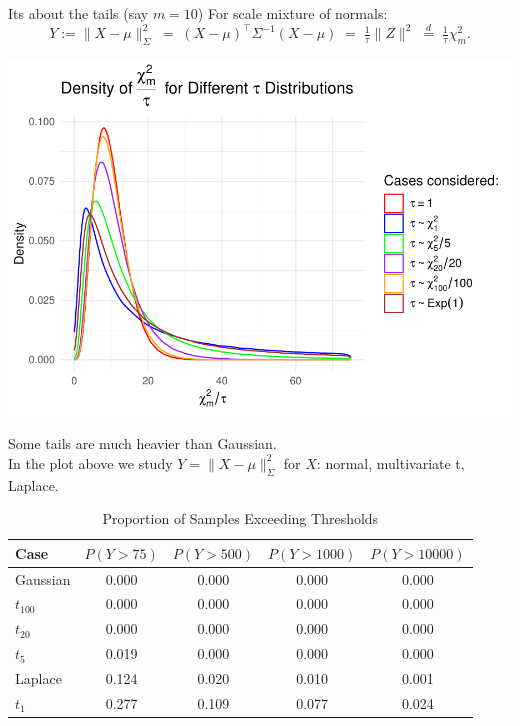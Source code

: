 \documentclass[11pt,handout,aspectratio=169]{beamer}
\begin{document}
\begin{frame}{Its about the tails (say $m=10$)}
	For scale mixture of normals:
	$$
	Y:=\|X-\mu\|_\Sigma^2\;=\;(X-\mu)^\top \Sigma^{-1}(X-\mu)\;=\;\tfrac{1}{\tau}\|Z\|^2\;\overset{d}{=}\;\tfrac{1}{\tau} \chi^2_m.
	$$
	\begin{center}
		\includegraphics[scale=.7]{pics/SNMtails.pdf}
	\end{center}
\end{frame}

\begin{frame}{}
Some tails are \alert{much} heavier than Gaussian. \\[3mm]

In the plot above we study $Y=\|X-\mu\|_\Sigma^2$ for $X$: normal, multivariate t, Laplace. 
	\begin{table}[h]
    \centering
    \begin{tabular}{lcccc}
        \hline
        \textbf{Case} & $P(Y > 75)$ & $P(Y > 500)$ & $P(Y > 1000)$ & $P(Y > 10000)$ \\
        \hline
        Gaussian & 0.000 & 0.000 & 0.000 & 0.000 \\
        $t_{100}$ & 0.000 & 0.000 & 0.000 & 0.000 \\
        $t_{20}$ & 0.000 & 0.000 & 0.000 & 0.000 \\
        $t_{5}$ & 0.019 & 0.000 & 0.000 & 0.000 \\
        Laplace & 0.124 & 0.020 & 0.010 & 0.001 \\
        $t_{1}$ & 0.277 & 0.109 & 0.077 & 0.024 \\
        \hline
    \end{tabular}
    \caption{Proportion of Samples Exceeding Thresholds}
    \label{tab:proportion_thresholds}
\end{table}
\end{frame}
\end{document}
